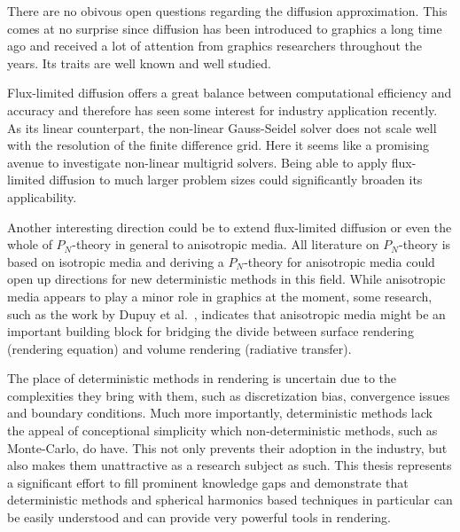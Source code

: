 There are no obivous open questions regarding the diffusion approximation. This comes at no surprise since diffusion has been introduced to graphics a long time ago and received a lot of attention from graphics researchers throughout the years. Its traits are well known and well studied.

Flux-limited diffusion offers a great balance between computational efficiency and accuracy and therefore has seen some interest for industry application recently. As its linear counterpart, the non-linear Gauss-Seidel solver does not scale well with the resolution of the finite difference grid. Here it seems like a promising avenue to investigate non-linear multigrid solvers. Being able to apply flux-limited diffusion to much larger problem sizes could significantly broaden its applicability.

Another interesting direction could be to extend flux-limited diffusion or even the whole of $P_N$-theory in general to anisotropic media. All literature on $P_N$-theory is based on isotropic media and deriving a $P_N$-theory for anisotropic media could open up directions for new deterministic methods in this field. While anisotropic media appears to play a minor role in graphics at the moment, some research, such as the work by Dupuy et al.~\cite{Dupuy16}, indicates that anisotropic media might be an important building block for bridging the divide between surface rendering (rendering equation) and volume rendering (radiative transfer).

The place of deterministic methods in rendering is uncertain due to the complexities they bring with them, such as discretization bias, convergence issues and boundary conditions. Much more importantly, deterministic methods lack the appeal of conceptional simplicity which non-deterministic methods, such as Monte-Carlo, do have. This not only prevents their adoption in the industry, but also makes them unattractive as a research subject as such. This thesis represents a significant effort to fill prominent knowledge gaps and demonstrate that deterministic methods and spherical harmonics based techniques in particular can be easily understood and can provide very powerful tools in rendering.







